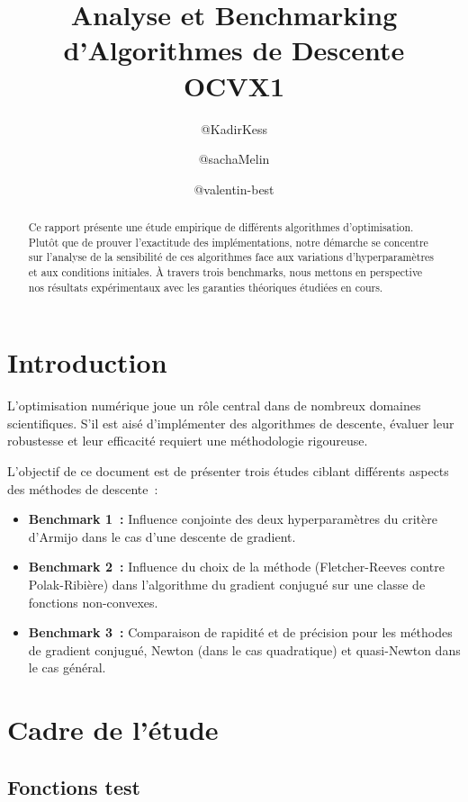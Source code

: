 \documentclass[10pt,a4paper]{article}
\title{\textbf{Analyse et Benchmarking d'Algorithmes de Descente}\\ \vspace{3mm} \large{OCVX1}}
\author{
    @KadirKess
    \and 
    @sachaMelin
    \and 
    @valentin-best
}
\date{}
\begin{document}
\maketitle

\begin{abstract}
\noindent Ce rapport présente une étude empirique de différents algorithmes d'optimisation. Plutôt que de prouver l'exactitude des implémentations, notre démarche se concentre sur l'analyse de la sensibilité de ces algorithmes face aux variations d'hyperparamètres et aux conditions initiales. À travers trois benchmarks, nous mettons en perspective nos résultats expérimentaux avec les garanties théoriques étudiées en cours.
\end{abstract}

\tableofcontents

\newpage

\section*{Introduction}
L'optimisation numérique joue un rôle central dans de nombreux domaines scientifiques. S'il est aisé d'implémenter des algorithmes de descente, évaluer leur robustesse et leur efficacité requiert une méthodologie rigoureuse. 

L'objectif de ce document est de présenter trois études ciblant différents aspects des méthodes de descente~:
\begin{itemize}
    \item \textbf{Benchmark 1~:} Influence conjointe des deux hyperparamètres du critère d'Armijo dans le cas d'une descente de gradient.
    \item \textbf{Benchmark 2~:} Influence du choix de la méthode (Fletcher-Reeves contre Polak-Ribière) dans l'algorithme du gradient conjugué sur une classe de fonctions non-convexes.
    \item \textbf{Benchmark 3~:} Comparaison de rapidité et de précision pour les méthodes de gradient conjugué, Newton (dans le cas quadratique) et quasi-Newton dans le cas général.
\end{itemize}


\section{Cadre de l'étude}

\subsection{Fonctions test}\label{sec:fonctions}
\end{document}
